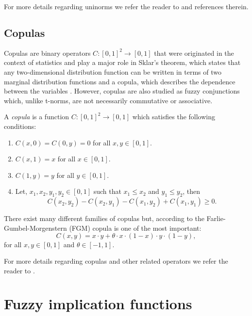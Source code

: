 For more details regarding uninorms we refer the reader to \cite{Mas2015} and references therein.

\subsection{Copulas}

Copulas are binary operators $C:[0,1]^2 \to [0,1]$ that were originated in the context of statistics and play a major role in Sklar's theorem, which states that any two-dimensional distribution function can be written in terms of two marginal distribution functions and a copula, which describes the dependence between the variables \cite{Sklar1959,Nelsen1999}. However, copulas are also studied as fuzzy conjunctions which, unlike t-norms, are not necessarily commutative or associative.
\begin{definition}
	A \emph{copula} is a function $C: [0,1]^2 \to [0,1]$ which satisfies the following conditions:
	\begin{enumerate}[label=(\roman*)]
		\item $C(x,0)=C(0,y)=0$ for all $x,y \in [0,1]$.
		\item $C(x,1)=x$ for all $x \in [0,1]$.
		\item $C(1,y)=y$ for all $y \in [0,1]$.
		\item Let, $x_1,x_2,y_1,y_2 \in [0,1]$ such that $x_1 \leq x_2$ and $y_1 \leq y_2$, then
		$$C(x_2,y_2)-C(x_2,y_1)-C(x_1,y_2)+C(x_1,y_1) \geq 0.$$
	\end{enumerate}
\end{definition}

\begin{example}
There exist many different families of copulas but, according to \cite{Sriboonchitta2018} the Farlie-Gumbel-Morgenstern (FGM) copula is one of the most important:
$$C(x,y)=x \cdot y + \theta \cdot x \cdot (1-x) \cdot y \cdot (1-y),$$
for all $x,y \in [0,1]$ and $\theta \in [-1,1]$.
\end{example}

For more details regarding copulas and other related operators we refer the reader to \cite{Nelsen1999,Beliakov2010,Calvo2002,Grabisch2009}.


\section{Fuzzy implication functions}\label{section:fuzzy_implication_functions}

